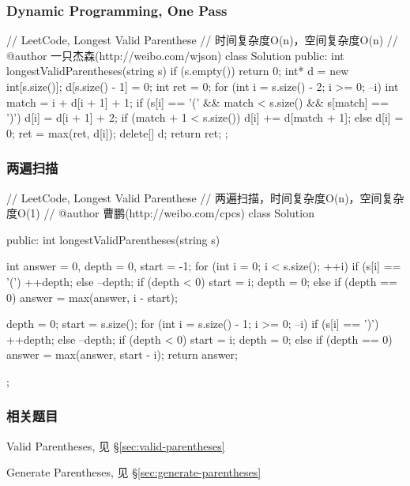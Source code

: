 \subsubsection{Dynamic Programming, One Pass}
\begin{Code}
// LeetCode, Longest Valid Parenthese
// 时间复杂度O(n)，空间复杂度O(n)
// @author 一只杰森(http://weibo.com/wjson)
class Solution {
public:
    int longestValidParentheses(string s) {
        if (s.empty()) return 0;
        int* d = new int[s.size()];
        d[s.size() - 1] = 0;
        int ret = 0;
        for (int i = s.size() - 2; i >= 0; --i) {
            int match = i + d[i + 1] + 1;
            if (s[i] == '(' && match < s.size() && s[match] == ')') {
                d[i] = d[i + 1] + 2;
                if (match + 1 < s.size()) d[i] += d[match + 1];
            } else {
                d[i] = 0;
            }
            ret = max(ret, d[i]);
        }
        delete[] d;
        return ret;
    }
};
\end{Code}


\subsubsection{两遍扫描}
\begin{Code}
// LeetCode, Longest Valid Parenthese
// 两遍扫描，时间复杂度O(n)，空间复杂度O(1)
// @author 曹鹏(http://weibo.com/cpcs)
class Solution {
public:
    int longestValidParentheses(string s) {
        int answer = 0, depth = 0, start = -1;
        for (int i = 0; i < s.size(); ++i) {
            if (s[i] == '(') {
                ++depth;
            } else {
                --depth;
                if (depth < 0) {
                    start = i;
                    depth = 0;
                } else if (depth == 0) {
                    answer = max(answer, i - start);
                }
            } 
        }

        depth = 0;
        start = s.size();
        for (int i = s.size() - 1; i >= 0; --i) {
            if (s[i] == ')') {
                ++depth;
            } else {
                --depth;
                if (depth < 0) {
                    start = i;
                    depth = 0;
                } else if (depth == 0) {
                    answer = max(answer, start - i);
                }
            } 
        }
        return answer;
    }
};
\end{Code}


\subsubsection{相关题目}
\begindot
\item Valid Parentheses, 见 \S \ref{sec:valid-parentheses}
\item Generate Parentheses, 见 \S \ref{sec:generate-parentheses}
\myenddot


